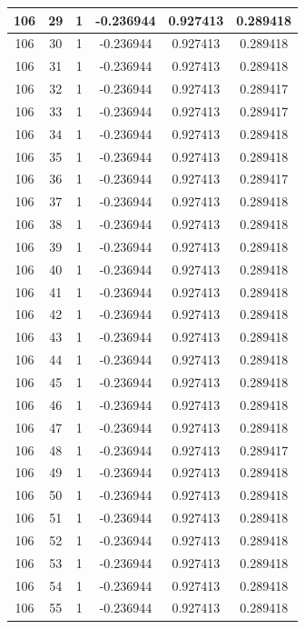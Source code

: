 \documentclass[12pt,a4paper]{article}
\numberwithin{equation}{section}
\numberwithin{figure}{section}
\numberwithin{table}{section}
\begin{document}
\begin{longtable}{|c|c|c|c|c|c|}
106 & 29 & 1 & -0.236944 & 0.927413 & 0.289418 \\ \hline
106 & 30 & 1 & -0.236944 & 0.927413 & 0.289418 \\ \hline
106 & 31 & 1 & -0.236944 & 0.927413 & 0.289418 \\ \hline
106 & 32 & 1 & -0.236944 & 0.927413 & 0.289417 \\ \hline
106 & 33 & 1 & -0.236944 & 0.927413 & 0.289417 \\ \hline
106 & 34 & 1 & -0.236944 & 0.927413 & 0.289418 \\ \hline
106 & 35 & 1 & -0.236944 & 0.927413 & 0.289418 \\ \hline
106 & 36 & 1 & -0.236944 & 0.927413 & 0.289417 \\ \hline
106 & 37 & 1 & -0.236944 & 0.927413 & 0.289418 \\ \hline
106 & 38 & 1 & -0.236944 & 0.927413 & 0.289418 \\ \hline
106 & 39 & 1 & -0.236944 & 0.927413 & 0.289418 \\ \hline
106 & 40 & 1 & -0.236944 & 0.927413 & 0.289418 \\ \hline
106 & 41 & 1 & -0.236944 & 0.927413 & 0.289418 \\ \hline
106 & 42 & 1 & -0.236944 & 0.927413 & 0.289418 \\ \hline
106 & 43 & 1 & -0.236944 & 0.927413 & 0.289418 \\ \hline
106 & 44 & 1 & -0.236944 & 0.927413 & 0.289418 \\ \hline
106 & 45 & 1 & -0.236944 & 0.927413 & 0.289418 \\ \hline
106 & 46 & 1 & -0.236944 & 0.927413 & 0.289418 \\ \hline
106 & 47 & 1 & -0.236944 & 0.927413 & 0.289418 \\ \hline
106 & 48 & 1 & -0.236944 & 0.927413 & 0.289417 \\ \hline
106 & 49 & 1 & -0.236944 & 0.927413 & 0.289418 \\ \hline
106 & 50 & 1 & -0.236944 & 0.927413 & 0.289418 \\ \hline
106 & 51 & 1 & -0.236944 & 0.927413 & 0.289418 \\ \hline
106 & 52 & 1 & -0.236944 & 0.927413 & 0.289418 \\ \hline
106 & 53 & 1 & -0.236944 & 0.927413 & 0.289418 \\ \hline
106 & 54 & 1 & -0.236944 & 0.927413 & 0.289418 \\ \hline
106 & 55 & 1 & -0.236944 & 0.927413 & 0.289418 \\ \hline

\end{longtable}
\end{document}
